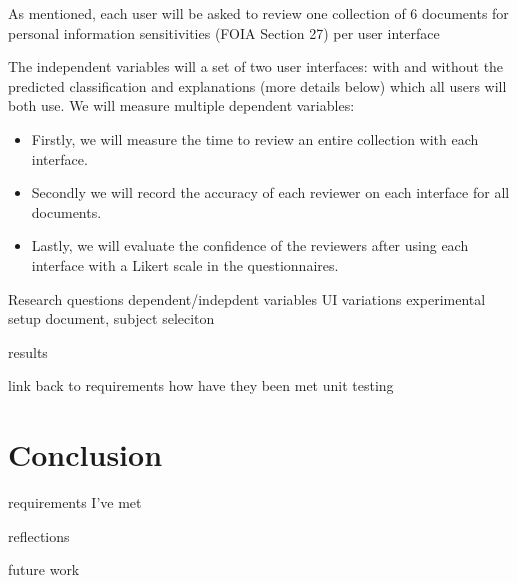 \documentclass{l4proj}
\begin{document}
As mentioned, each user will be asked to review one collection of 6 documents for personal information sensitivities (FOIA Section 27) per user interface

The independent variables will a set of two user interfaces: with and without the predicted classification and explanations (more details below) which all users will both use. We will measure multiple dependent variables:

\begin{itemize}
    \item Firstly, we will measure the time to review an entire collection with each interface.
    \item Secondly we will record the accuracy of each reviewer on each interface for all documents.
    \item Lastly, we will evaluate the confidence of the reviewers after using each interface with a Likert scale in the questionnaires.
          
\end{itemize}




Research questions
dependent/indepdent variables
UI variations
experimental setup
document, subject seleciton


results


link back to requirements 
how have they been met
unit testing




\chapter{Conclusion}


requirements I've met


reflections 

future work

%
% 
\end{document}
